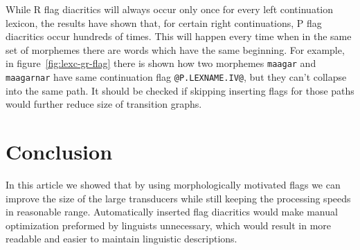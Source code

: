 \documentclass[11pt]{article}
\begin{document}
While R flag diacritics will always occur only once for every left continuation lexicon, the results have shown that, for certain right continuations, P flag diacritics occur hundreds of times. This will happen every time when in the same set of morphemes there are words which have the same beginning. For example, in figure~\ref{fig:lexc-gr-flag} there is shown how two morphemes \texttt{maagar} and \texttt{maagarnar} have same continuation flag \verb+@P.LEXNAME.IV@+, but they can't collapse into the same path. It should be checked if skipping inserting flags for those paths would further reduce size of transition graphs.






\section{Conclusion}
\label{sec:conclusion}

In this article we showed that by using morphologically motivated flags we can
improve the size of the large transducers while still keeping the processing speeds in reasonable range. 
Automatically inserted flag diacritics would make manual optimization preformed by linguists unnecessary, which would result in  
more readable and easier to maintain linguistic descriptions.

\end{document}
